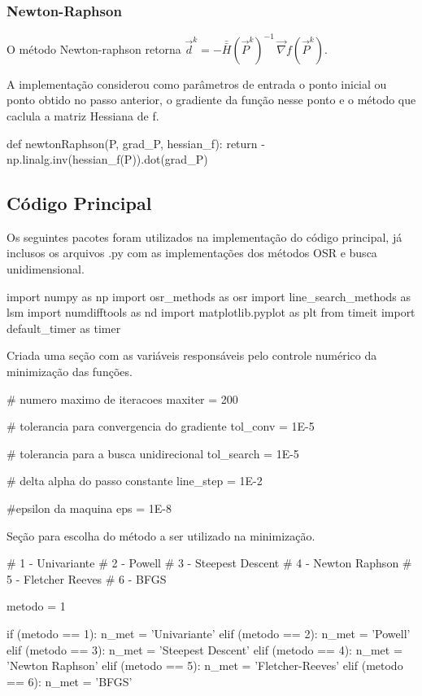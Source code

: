 \documentclass[10pt, a4paper]{article}
\begin{document}
\subsubsection{Newton-Raphson}
O método Newton-raphson retorna $\overrightarrow{d}^k = -\bar{\bar{H}}(\overrightarrow{P}^k)^{-1}\,\overrightarrow{\nabla}f(\overrightarrow{P}^k)$.

A implementação considerou como parâmetros de entrada o ponto inicial ou ponto obtido no passo anterior, o gradiente da função nesse ponto e o método que caclula
a matriz Hessiana de f.

\begin{python}
  def newtonRaphson(P, grad_P, hessian_f):
    return -np.linalg.inv(hessian_f(P)).dot(grad_P)
\end{python}

\subsection{Código Principal}

Os seguintes pacotes foram utilizados na implementação do código principal, já inclusos os arquivos .py com as implementações dos métodos OSR e busca unidimensional.

\begin{python}
  import numpy as np
  import osr_methods as osr
  import line_search_methods as lsm
  import numdifftools as nd
  import matplotlib.pyplot as plt
  from timeit import default_timer as timer
\end{python}

Criada uma seção com as variáveis responsáveis pelo controle numérico da minimização das funções.

\begin{python}
  # numero maximo de iteracoes 
  maxiter = 200

  # tolerancia para convergencia do gradiente
  tol_conv = 1E-5

  # tolerancia para a busca unidirecional
  tol_search = 1E-5

  # delta alpha do passo constante
  line_step = 1E-2

  #epsilon da maquina
  eps = 1E-8
\end{python}

Seção para escolha do método a ser utilizado na minimização.

\begin{python}
  # 1 - Univariante
  # 2 - Powell
  # 3 - Steepest Descent
  # 4 - Newton Raphson
  # 5 - Fletcher Reeves
  # 6 - BFGS

  metodo = 1

  if (metodo == 1):
      n_met = 'Univariante'
  elif (metodo == 2):
      n_met = 'Powell'
  elif (metodo == 3):
      n_met = 'Steepest Descent'
  elif (metodo == 4):
      n_met = 'Newton Raphson'
  elif (metodo == 5):
      n_met = 'Fletcher-Reeves'
  elif (metodo == 6):
      n_met = 'BFGS'
\end{python}
\end{document}
